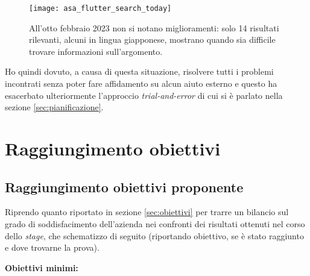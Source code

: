 \begin{figure}[H]
  \centering
  \texttt{[image: asa\_flutter\_search\_today]}
  \caption[Ricerca esatta Flutter e ASA 8 febbraio]{All'otto febbraio 2023 non si notano miglioramenti: solo 14 risultati rilevanti, alcuni in lingua giapponese, mostrano quando sia difficile trovare informazioni sull'argomento.}
  \label{fig:search2}
\end{figure}

Ho quindi dovuto, a causa di questa situazione, risolvere tutti i problemi incontrati senza poter fare affidamento su alcun aiuto esterno e questo ha esacerbato ulteriormente l'approccio \textit{trial-and-error} di cui si è parlato nella sezione \ref{sec:pianificazione}.


\section{Raggiungimento obiettivi}
\subsection{Raggiungimento obiettivi proponente}
Riprendo quanto riportato in sezione \ref{sec:obiettivi} per trarre un bilancio sul grado di soddisfacimento dell'azienda nei confronti dei risultati ottenuti nel corso dello \textit{stage}, che schematizzo di seguito (riportando obiettivo, se è stato raggiunto e dove trovarne la prova).

\aCapo{}
\textbf{Obiettivi minimi:}

